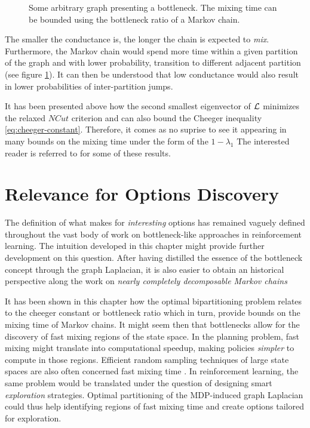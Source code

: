 \begin{figure}
\centering 

\caption{Some arbitrary graph presenting a bottleneck. The mixing time can be bounded using the bottleneck ratio of a Markov chain.}
\label{fig:bottleneck}
\end{figure}

The smaller the conductance is, the longer the chain is expected to \textit{mix}.
Furthermore, the Markov chain would spend more time within a given partition of the
graph and with lower probability, transition to different adjacent partition (see figure \ref{fig:bottleneck}). It can then be
understood that low conductance would also result in lower probabilities of inter-partition
jumps.

It has been presented above how the second smallest eigenvector of $\mathbf{\mathcal{L}}$
minimizes the relaxed $NCut$ criterion and can also bound the Cheeger inequality
\ref{eq:cheeger-constant}. Therefore, it comes as no suprise to see it appearing in many
bounds on the mixing time under the form of the  $1 - \lambda_1$ The interested reader is referred to \cite{Jerrum1988, Lovasz1996,
Levin2008} for some of these results. 

\section{Relevance for Options Discovery}
\label{sec:ndmc}
The definition of what makes for \textit{interesting} options has remained vaguely
defined throughout the vast body of work on bottleneck-like approaches in
reinforcement learning. The intuition developed in this chapter might provide further
development on this question. After having distilled the essence of the bottleneck
concept through the graph Laplacian, it is also easier to obtain an historical perspective
along the work on \textit{nearly completely decomposable Markov chains}

It has been shown in this chapter how the optimal bipartitioning problem relates to the
cheeger constant or bottleneck ratio which in turn, provide bounds on the mixing time
of Markov chains. It might seem then that bottlenecks allow for the discovery of fast
mixing regions of the state space. In the planning problem, fast mixing might translate
into computational speedup, making policies \textit{simpler} to compute in those
regions. Efficient random sampling techniques of large state spaces are also often
concerned fast mixing time \cite{Boyd2004}. In reinforcement learning, the same
problem would be translated under the question of designing smart \textit{exploration}
strategies. Optimal partitioning of the MDP-induced graph Laplacian could thus help
identifying regions of fast mixing time and create options tailored for exploration.

